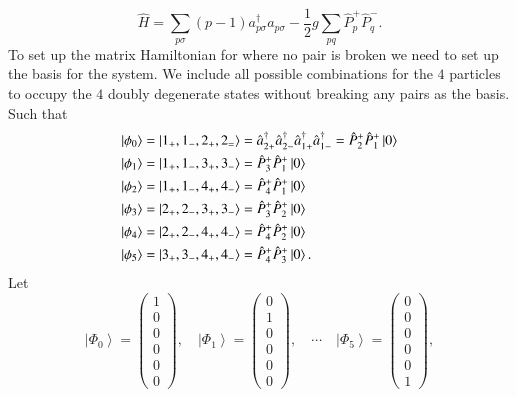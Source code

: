 \begin{equation}
	\label{eq:pairing-inP}
	\hat{H}=\sum_{p \sigma}(p-1) a_{p \sigma}^{\dagger} a_{p \sigma}-\frac{1}{2} g \sum_{p q} \hat{P}_p^{+} \hat{P}_q^{-}.
\end{equation}
To set up the matrix Hamiltonian for where no pair is broken we need to set up the basis for the system. We include all possible combinations for the $ 4 $ particles to occupy the $ 4 $ doubly degenerate states without breaking any pairs as the basis. Such that
\begin{equation}
	\label{eq:pairing-basis}
	\begin{aligned}
		\ket{\phi_0} &= \ket{1_+,1_-,2_+,2_=} = \hat a_{2+}^{\dagger} \hat a_{2-}^{\dagger} \hat a_{1+}^{\dagger} \hat a_{1-}^{\dagger} = \hat P_{2}^{+} \hat P_{1}^{+} \ket{0}  \\
		\ket{\phi_1} &= \ket{1_+,1_-,3_+,3_-} = \hat P_{3}^{+} \hat P_{1}^{+} \ket{0} \\
		\ket{\phi_2} &= \ket{1_+,1_-,4_+,4_-} = \hat P_{4}^{+} \hat P_{1}^{+} \ket{0} \\
		\ket{\phi_3} &= \ket{2_+,2_-,3_+,3_-} = \hat P_{3}^{+} \hat P_{2}^{+} \ket{0} \\
		\ket{\phi_4} &= \ket{2_+,2_-,4_+,4_-}  = \hat P_{4}^{+} \hat P_{2}^{+} \ket{0} \\
		\ket{\phi_5} &= \ket{3_+,3_-,4_+,4_-} = \hat P_{4}^{+} \hat P_{3}^{+} \ket{0}.
	\end{aligned}
\end{equation}
Let 
\[ \left|\Phi_0\right\rangle=\left(\begin{array}{l}
1 \\
0 \\
0 \\
0 \\
0 \\
0
\end{array}\right), \quad\left|\Phi_1\right\rangle=\left(\begin{array}{l}
0 \\
1 \\
0 \\
0 \\
0 \\
0
\end{array}\right), \quad \cdots \quad\left|\Phi_5\right\rangle=\left(\begin{array}{l}
0 \\
0 \\
0 \\
0 \\
0 \\
1
\end{array}\right), \] 
